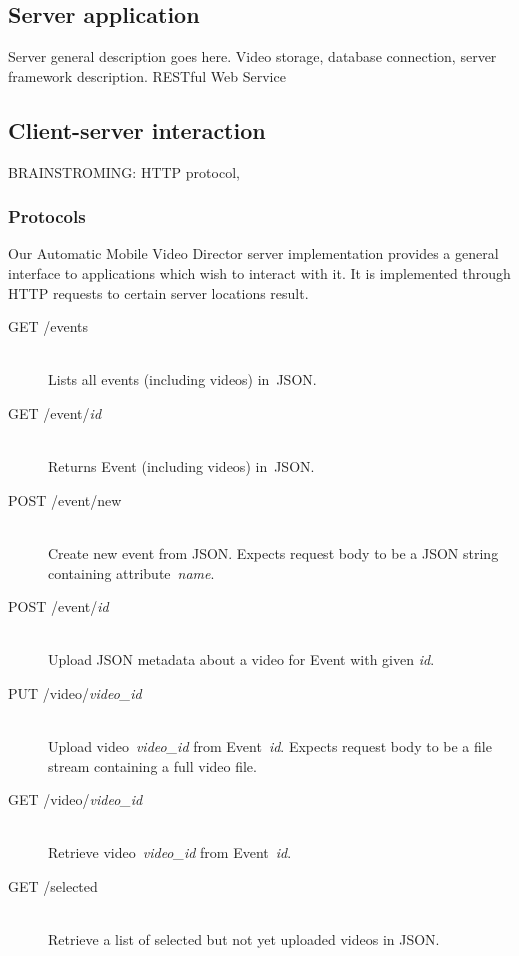 \documentclass[conference]{IEEEtran}
\begin{document}
\subsection{Server application}
Server general description goes here.
Video storage, database connection, server framework description. RESTful Web Service

\subsection{Client-server interaction}
BRAINSTROMING: HTTP protocol, 

\subsubsection{Protocols}
Our Automatic Mobile Video Director server implementation provides 
a general interface to applications which wish to interact with it. 
It is implemented through HTTP requests to certain server locations result.

\begin{description}
	\item[GET /events]\hfill\\
		Lists all events (including videos) in~JSON.
		
	\item[GET /event/\textit{id}]\hfill\\
		Returns Event (including videos) in~JSON.
				
	\item[POST /event/new]\hfill\\
		Create new event from JSON.
		Expects request body to be a JSON string containing attribute~\textit{name}.
		
	\item[POST /event/\textit{id}]\hfill\\
		Upload JSON metadata about a video for Event with given \textit{id}.
		
	\item[PUT /video/\textit{video\_id}]\hfill\\
		Upload video~\textit{video\_id} from Event~\textit{id}.
		Expects request body to be a file stream containing a full video file.
		
	\item[GET /video/\textit{video\_id}]\hfill\\
		Retrieve video~\textit{video\_id} from Event~\textit{id}.
		
	\item[GET /selected]\hfill\\
		Retrieve a list of selected but not yet uploaded videos in JSON.		
		
\end{description}
\end{document}

